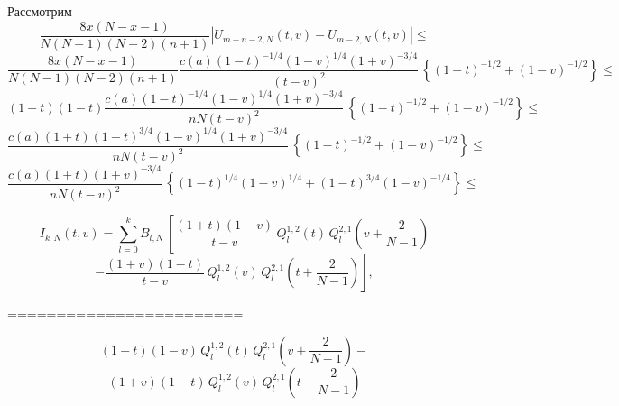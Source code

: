 \documentclass[12pt]{book}
\begin{document}
Рассмотрим
\begin{equation*}
\frac{8x(N-x-1)}{N(N-1)(N-2)(n+1)} \left| U_{m+n-2,N}(t,v) - U_{m-2,N}(t,v) \right| \leq
\end{equation*}
\begin{equation*}
\frac{8x(N-x-1)}{N(N-1)(N-2)(n+1)}
\frac{c(a)(1-t)^{-1/4}(1-v)^{1/4}(1+v)^{-3/4} }{(t-v)^2}\,
\left\{
    (1-t)^{-1/2} +    (1-v)^{-1/2}
\right\}
\leq
\end{equation*}
\begin{equation*}
(1+t)(1-t)
\frac{c(a)(1-t)^{-1/4}(1-v)^{1/4}(1+v)^{-3/4} }{nN(t-v)^2}\,
\left\{
    (1-t)^{-1/2} +    (1-v)^{-1/2}
\right\}
\leq
\end{equation*}
\begin{equation*}
\frac{c(a)(1+t)(1-t)^{3/4}(1-v)^{1/4}(1+v)^{-3/4} }{nN(t-v)^2}\,
\left\{
    (1-t)^{-1/2} +    (1-v)^{-1/2}
\right\}
\leq
\end{equation*}
\begin{equation*}
\frac{c(a)(1+t)(1+v)^{-3/4} }{nN(t-v)^2}\,
\left\{
    (1-t)^{1/4}(1-v)^{1/4}+   (1-t)^{3/4}(1-v)^{-1/4}
\right\}
\leq
\end{equation*}





















\newpage
\newpage





\begin{equation*}
  I_{k,N}(t,v) =
  \sum_{l=0}^{k} B_{l,N} \,
  \left[
    \frac{(1+t)(1-v)}{t-v}\,Q^{1,2}_{l}(t)\,Q^{2,1}_{l}\left(v+\frac{2}{N-1}\right)
  \right.
\end{equation*}
\begin{equation*}
\left.
  - \frac{(1+v)(1-t)}{t-v}\,Q^{1,2}_{l}(v)\,Q^{2,1}_{l}\left(t+\frac{2}{N-1}\right)
\right],
\end{equation*}

========================

\begin{equation*}
(1+t)(1-v)\,
Q^{1,2}_{l}(t)
\,
Q^{2,1}_{l}\left(v+\frac{2}{N-1}\right)
-
\end{equation*}
\begin{equation*}
  (1+v)(1-t)\,
  Q^{1,2}_{l}(v)
  \,
  Q^{2,1}_{l}\left(t+\frac{2}{N-1}\right)
\end{equation*}
\end{document}
